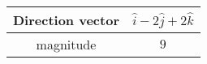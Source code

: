 \begin{tabular}[12pt]{ |c| c|}
    \hline
    Direction vector & $\hat{i} - 2\hat{j} + 2\hat{k}$ \\
    \hline 
    magnitude & $9$\\
    \hline 
    \end{tabular}